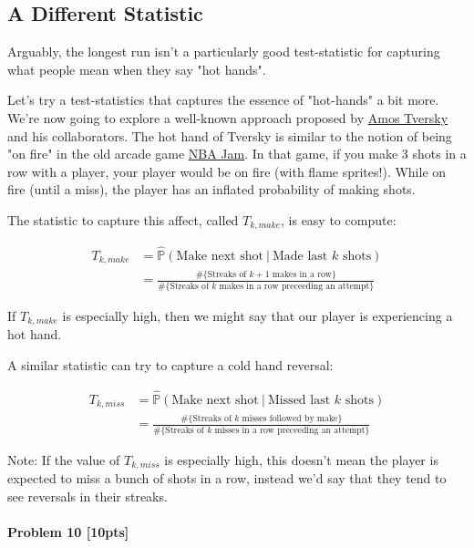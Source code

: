 \documentclass[11pt]{article}
\begin{document}
    \subsection{A Different Statistic}\label{a-different-statistic}

Arguably, the longest run isn't a particularly good test-statistic for
capturing what people mean when they say "hot hands".

Let's try a test-statistics that captures the essence of "hot-hands" a
bit more. We're now going to explore a well-known approach proposed by
\href{https://en.wikipedia.org/wiki/Amos_Tversky}{Amos Tversky} and his
collaborators. The hot hand of Tversky is similar to the notion of being
"on fire" in the old arcade game
\href{https://www.youtube.com/watch?v=ipzstdPtxNw}{NBA Jam}. In that
game, if you make 3 shots in a row with a player, your player would be
on fire (with flame sprites!). While on fire (until a miss), the player
has an inflated probability of making shots.

The statistic to capture this affect, called \(T_{k, make}\), is easy to
compute:

\begin{align*}
  T_{k, make}
  & = \hat{\mathbb{P}}(\text{Make next shot}\ \vert\ \text{Made last $k$ shots})\\
  & = \frac{\#\{\text{Streaks of $k+1$ makes in a row}\}}{\#\{\text{Streaks of $k$ makes in a row preceeding an attempt}\}}
\end{align*}

If \(T_{k, make}\) is especially high, then we might say that our player
is experiencing a hot hand.

A similar statistic can try to capture a cold hand reversal:

\begin{align*}
  T_{k, miss}
  & = \hat{\mathbb{P}}(\text{Make next shot}\ \vert\ \text{Missed last $k$ shots})\\
  & = \frac{\#\{\text{Streaks of $k$ misses followed by make}\}}{\#\{\text{Streaks of $k$ misses in a row preceeding an attempt}\}}
\end{align*}

Note: If the value of \(T_{k, miss}\) is especially high, this doesn't
mean the player is expected to miss a bunch of shots in a row, instead
we'd say that they tend to see reversals in their streaks.

\paragraph{Problem 10 {[}10pts{]}}\label{problem-10-10pts}
\end{document}
